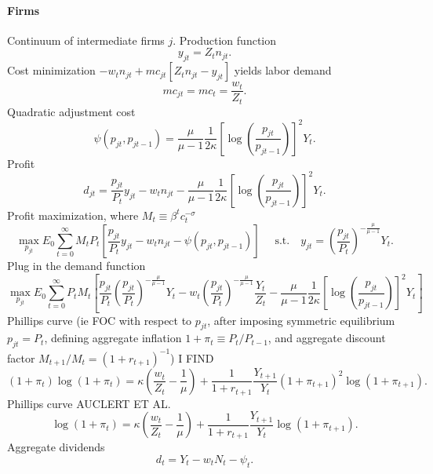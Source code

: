 \documentclass[11pt,a4paper]{article}
\begin{document}
\paragraph{Firms}
Continuum of intermediate firms $j$. Production function
\begin{equation*}
y_{jt}=Z_tn_{jt}.
\end{equation*}
Cost minimization $-w_tn_{jt}+mc_{jt}[Z_tn_{jt}-y_{jt}]$ yields labor demand
\begin{equation*}
mc_{jt}=mc_t=\frac{w_t}{Z_t}.
\end{equation*}
Quadratic adjustment cost
\begin{equation*}
\psi(p_{jt},p_{jt-1})=\frac{\mu}{\mu-1}\frac{1}{2\kappa}\left[\log\left(\frac{p_{jt}}{p_{jt-1}}\right)\right]^2Y_t.
\end{equation*}
Profit
\begin{equation*}
d_{jt}=\frac{p_{jt}}{P_t}y_{jt}-w_tn_{jt}-\frac{\mu}{\mu-1}\frac{1}{2\kappa}\left[\log\left(\frac{p_{jt}}{p_{jt-1}}\right)\right]^2Y_t.
\end{equation*}
Profit maximization, where $M_{t}\equiv\beta^t c_{t}^{-\sigma}$
\begin{equation*}
\max_{p_{jt}}E_0\sum_{t=0}^{\infty}M_{t}P_t\left[\frac{p_{jt}}{P_t}y_{jt}-w_tn_{jt}-\psi(p_{jt},p_{jt-1})\right]\quad\text{ s.t.}\quad y_{jt}=\left(\frac{p_{jt}}{P_t}\right)^{-\frac{\mu}{\mu-1}}Y_t.
\end{equation*}
Plug in the demand function
\begin{equation*}
\max_{p_{jt}}E_0\sum_{t=0}^{\infty}P_tM_{t}\left[\frac{p_{jt}}{P_t}\left(\frac{p_{jt}}{P_t}\right)^{-\frac{\mu}{\mu-1}}Y_t-w_t\left(\frac{p_{jt}}{P_t}\right)^{-\frac{\mu}{\mu-1}}\frac{Y_t}{Z_t}-\frac{\mu}{\mu-1}\frac{1}{2\kappa}\left[\log\left(\frac{p_{jt}}{p_{jt-1}}\right)\right]^2Y_t\right]
\end{equation*}
Phillips curve (ie FOC with respect to $p_{jt}$, after imposing symmetric equilibrium $p_{jt}=P_t$, defining aggregate inflation $1+\pi_t\equiv P_{t}/P_{t-1}$, and aggregate discount factor $M_{t+1}/M_t=(1+r_{t+1})^{-1}$)
I FIND
\begin{equation*}
(1+\pi_t)\log(1+\pi_t)=\kappa\left(\frac{w_t}{Z_t}-\frac{1}{\mu}\right)+\frac{1}{1+r_{t+1}}\frac{Y_{t+1}}{Y_t}(1+\pi_{t+1})^2\log(1+\pi_{t+1}).
\end{equation*}
Phillips curve AUCLERT ET AL.
\begin{equation*}
\log(1+\pi_t)=\kappa\left(\frac{w_t}{Z_t}-\frac{1}{\mu}\right)+\frac{1}{1+r_{t+1}}\frac{Y_{t+1}}{Y_t}\log(1+\pi_{t+1}).
\end{equation*}
Aggregate dividends
\begin{equation*}
d_t=Y_t-w_tN_t-\psi_t.
\end{equation*}
\end{document}
